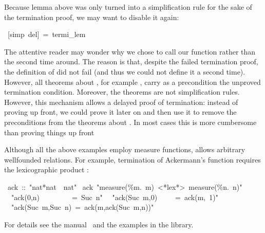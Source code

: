 \begin{isabelle}
\begin{isamarkuptext}
Because lemma  above was only turned into a
simplification rule for the sake of the termination proof, we may want to
disable it again:%
\end{isamarkuptext}%
\ [simp\ del]\ =\ termi\_lem%
\begin{isamarkuptext}%
The attentive reader may wonder why we chose to call our function 
rather than  the second time around. The reason is that, despite
the failed termination proof, the definition of  did not
fail (and thus we could not define it a second time). However, all theorems
about , for example , carry as a precondition the
unproved termination condition. Moreover, the theorems  are
not simplification rules. However, this mechanism allows a delayed proof of
termination: instead of proving  up front, we could prove
it later on and then use it to remove the preconditions from the theorems
about . In most cases this is more cumbersome than proving things
up front

Although all the above examples employ measure functions, 
allows arbitrary wellfounded relations. For example, termination of
Ackermann's function requires the lexicographic product :%
\end{isamarkuptext}%
\ ack\ ::\ {"}nat*nat\ {\isasymRightarrow}\ nat{"}\isanewline
{}\ ack\ {"}measure(\%m.\ m)\ <*lex*>\ measure(\%n.\ n){"}\isanewline
\ \ {"}ack(0,n)\ \ \ \ \ \ \ \ \ =\ Suc\ n{"}\isanewline
\ \ {"}ack(Suc\ m,0)\ \ \ \ \ =\ ack(m,\ 1){"}\isanewline
\ \ {"}ack(Suc\ m,Suc\ n)\ =\ ack(m,ack(Suc\ m,n)){"}%
\begin{isamarkuptext}%
\noindent
For details see the manual~\cite{isabelle-HOL} and the examples in the
library.%
\end{isamarkuptext}%
\end{isabelle}%
